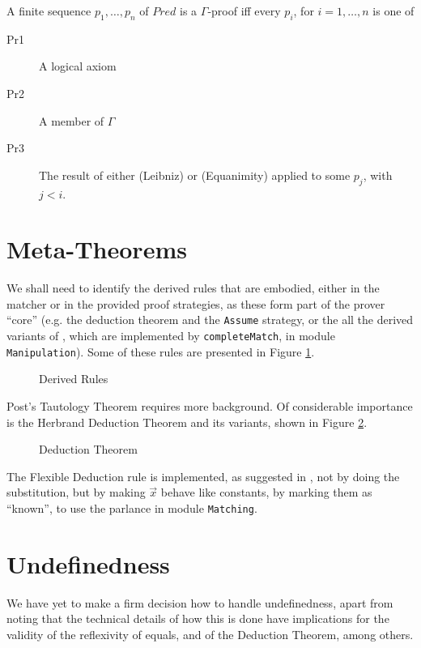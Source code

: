 A finite sequence $p_1,\ldots,p_n$ of $Pred$
is a $\Gamma$-proof iff every $p_i$, for $i=1,\ldots,n$
is one of
\begin{description}
  \item[Pr1] A logical axiom
  \item[Pr2] A member of $\Gamma$
  \item[Pr3] The result of either (Leibniz) or (Equanimity)
   applied to some $p_j$, with $j < i$.
\end{description}


\section{Meta-Theorems}

We shall need to identify the derived rules that are embodied,
either in the matcher or in the provided proof strategies,
as these form part of the prover ``core''
(e.g. the deduction theorem and the \texttt{Assume} strategy,
or the all the derived variants of ,
which are implemented by \texttt{completeMatch}, in module \texttt{Manipulation}).
Some of these rules are presented in Figure \ref{fig:UTP2:derived-rules}.
\begin{figure}
\begin{center}
\boxedm{$$
  \DERIVED
$$}
\end{center}
  \caption{ Derived Rules}
  \label{fig:UTP2:derived-rules}
\end{figure}
Post's Tautology Theorem
requires more background.
Of considerable importance is the Herbrand Deduction Theorem
and its variants, shown in Figure \ref{fig:UTP2:deduction-theorem}.
\begin{figure}
\begin{center}
\boxedm{$$
  \DEDUCTION
$$}
\end{center}
  \caption{ Deduction Theorem}
  \label{fig:UTP2:deduction-theorem}
\end{figure}
The Flexible Deduction rule is implemented,
as suggested in \cite{journals/logcom/Tourlakis01},
not by doing the substitution, but by making $\vec x$
behave like constants, by marking them as ``known'',
to use the parlance in module \texttt{Matching}.


\section{Undefinedness}

We have yet to make a firm decision how to handle undefinedness,
apart from noting that the technical details of how this is
done have implications for the validity of the reflexivity of equals,
and of the Deduction Theorem, among others.


